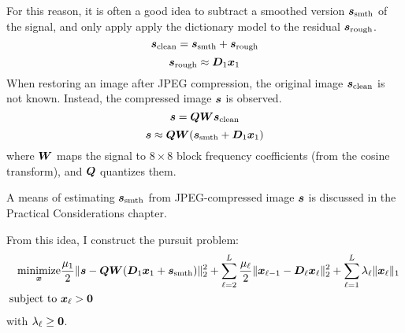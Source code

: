For this reason, it is often a good idea to subtract a smoothed version $\bm{s}_{\text{smth}}$ of the signal, and only apply apply the dictionary model to the residual $\bm{s}_{\text{rough}}$.
%
\begin{equation}
\bm{s}_{\text{clean}} = \bm{s}_{\text{smth}} + \bm{s}_{\text{rough}}
\end{equation}
%
\begin{equation}
\bm{s}_{\text{rough}} \approx \bm{D}_1\bm{x}_1
\end{equation}
%
When restoring an image after JPEG compression, the original image $\bm{s}_{\text{clean}}$ is not known. Instead, the compressed image $\bm{s}$ is observed.
%
\begin{equation}
\bm{s} = \bm{Q}\bm{W}\bm{s}_{\text{clean}}
\end{equation}
%
\begin{equation}
\bm{s} \approx \bm{Q}\bm{W}(\bm{s}_{\text{smth}} + \bm{D}_1\bm{x}_1)
\end{equation}
%
where $\bm{W}$ maps the signal to $8 \times 8$ block frequency coefficients (from the cosine transform), and $\bm{Q}$ quantizes them.

A means of estimating $\bm{s}_{\text{smth}}$ from JPEG-compressed image $\bm{s}$ is discussed in the Practical Considerations chapter.

From this idea, I construct the pursuit problem:
\begin{equation}
\begin{aligned}
\operatorname*{\text{minimize}}_{\bm{x}} & \frac{\mu_1}{2}\|\bm{s} - \bm{Q}\bm{W}(\bm{D}_1\bm{x}_1 + \bm{s}_{\text{smth}})\|_2^2 + \sum_{\ell = 2}^L \frac{\mu_{\ell}}{2}\|\bm{x}_{\ell - 1} - \bm{D}_{\ell}\bm{x}_{\ell}\|_2^2 + \sum_{\ell = 1}^L \lambda_{\ell}\|\bm{x}_{\ell}\|_1 \\
\text{subject to } & \bm{x}_{\ell} > \bm{0}
\end{aligned}
\end{equation}
%
with $\lambda_{\ell} \geq \bm{0}$.

